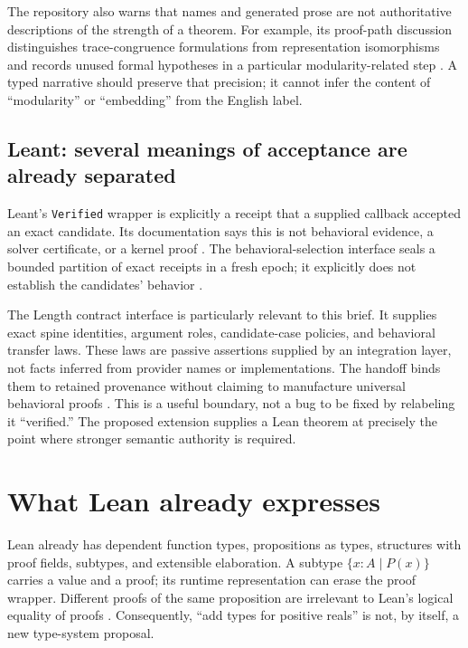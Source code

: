 \documentclass[11pt,a4paper]{article}
\theoremstyle{definition}
\theoremstyle{remark}
\newcommand{\code}[1]{\texttt{#1}}
\begin{document}
The repository also warns that names and generated prose are not authoritative descriptions of the strength of a theorem. For example, its proof-path discussion distinguishes trace-congruence formulations from representation isomorphisms and records unused formal hypotheses in a particular modularity-related step \cite{fltPath}. A typed narrative should preserve that precision; it cannot infer the content of ``modularity'' or ``embedding'' from the English label.

\subsection{Leant: several meanings of acceptance are already separated}
Leant's \code{Verified} wrapper is explicitly a receipt that a supplied callback accepted an exact candidate. Its documentation says this is not behavioral evidence, a solver certificate, or a kernel proof \cite{leantVerification}. The behavioral-selection interface seals a bounded partition of exact receipts in a fresh epoch; it explicitly does not establish the candidates' behavior \cite{leantBehavior}.

The Length contract interface is particularly relevant to this brief. It supplies exact spine identities, argument roles, candidate-case policies, and behavioral transfer laws. These laws are passive assertions supplied by an integration layer, not facts inferred from provider names or implementations. The handoff binds them to retained provenance without claiming to manufacture universal behavioral proofs \cite{leantLength}. This is a useful boundary, not a bug to be fixed by relabeling it ``verified.'' The proposed extension supplies a Lean theorem at precisely the point where stronger semantic authority is required.

\section{What Lean already expresses}
\label{sec:already}

Lean already has dependent function types, propositions as types, structures with proof fields, subtypes, and extensible elaboration. A subtype $\{x:A\mid P(x)\}$ carries a value and a proof; its runtime representation can erase the proof wrapper. Different proofs of the same proposition are irrelevant to Lean's logical equality of proofs \cite{leanSubtype,leanTypes}. Consequently, ``add types for positive reals'' is not, by itself, a new type-system proposal.
\end{document}
